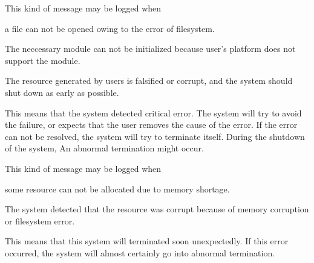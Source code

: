 \begin{Desc}
\begin{description}
This kind of message may be logged when
\begin{DoxyItemize}
\item a file can not be opened owing to the error of filesystem.
\item The neccessary module can not be initialized because user's platform does not support the module.
\item The resource generated by users is falsified or corrupt, and the system should shut down as early as possible. 
\end{DoxyItemize}\item[{\em 
\hypertarget{classhryky_1_1log_1_1_level_a9e6bba8f272859b212f49e4478a863d7a2bb8a07f237e71df835ee42379218ea7}{alert\-\_\-}\label{classhryky_1_1log_1_1_level_a9e6bba8f272859b212f49e4478a863d7a2bb8a07f237e71df835ee42379218ea7}
}]This means that the system detected critical error. The system will try to avoid the failure, or expects that the user removes the cause of the error. If the error can not be resolved, the system will try to terminate itself. During the shutdown of the system, An abnormal termination might occur.

This kind of message may be logged when
\begin{DoxyItemize}
\item some resource can not be allocated due to memory shortage.
\item The system detected that the resource was corrupt because of memory corruption or filesystem error. 
\end{DoxyItemize}\item[{\em 
\hypertarget{classhryky_1_1log_1_1_level_a9e6bba8f272859b212f49e4478a863d7a89780835043440040b9a3e7c03d44008}{emerg\-\_\-}\label{classhryky_1_1log_1_1_level_a9e6bba8f272859b212f49e4478a863d7a89780835043440040b9a3e7c03d44008}
}]This means that this system will terminated soon unexpectedly. If this error occurred, the system will almost certainly go into abnormal termination.


\end{description}
\end{Desc}
